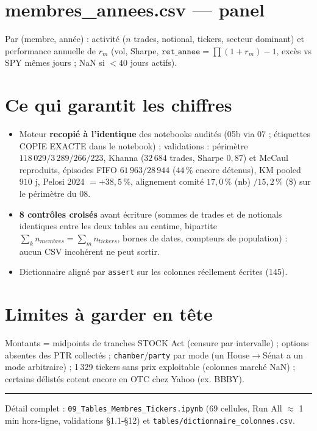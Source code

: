 \documentclass[10pt,a4paper,twocolumn]{article}
\begin{document}
\section{membres\_annees.csv --- panel}
Par (membre, année) : activité ($n$ trades, notional, tickers, secteur dominant) et performance
annuelle de $r_m$ (vol, Sharpe, $\texttt{ret\_annee} = \prod(1+r_m)-1$, excès vs SPY mêmes jours ;
NaN si $<40$ jours actifs).

\section{Ce qui garantit les chiffres}
\begin{itemize}
  \item Moteur \textbf{recopié à l'identique} des notebooks audités (05b via 07 ; étiquettes
  \og COPIE EXACTE\fg{} dans le notebook) ; validations : périmètre $118\,029 / 3\,289 / 266 / 223$,
  Khanna ($32\,684$ trades, Sharpe $0{,}87$) et McCaul reproduits, épisodes FIFO
  $61\,963 / 28\,944$ ($44\,\%$ encore détenus), KM pooled $910$ j, Pelosi 2024 $= +38{,}5\,\%$,
  alignement comité $17{,}0\,\%$ (nb) $/ 15{,}2\,\%$ (\$) sur le périmètre du 08.
  \item \textbf{8 contrôles croisés} avant écriture (sommes de trades et de notionals identiques
  entre les deux tables au centime, bipartite $\sum_k n_{membres} = \sum_m n_{tickers}$, bornes de
  dates, compteurs de population) : aucun CSV incohérent ne peut sortir.
  \item Dictionnaire aligné par \texttt{assert} sur les colonnes réellement écrites (145).
\end{itemize}

\section{Limites à garder en tête}
Montants = midpoints de tranches STOCK Act (censure par intervalle) ; options absentes des PTR
collectés ; \texttt{chamber}/\texttt{party} par mode (un House$\to$Sénat a un mode arbitraire) ;
1\,329 tickers sans prix exploitable (colonnes marché NaN) ; certains \og délistés\fg{} cotent
encore en OTC chez Yahoo (ex. BBBY).

\vspace{3pt}
\hrule
\vspace{2pt}
{\footnotesize\color{gris} Détail complet : \texttt{09\_Tables\_Membres\_Tickers.ipynb}
(69 cellules, Run All $\approx$ 1 min hors-ligne, validations \S1.1-\S12) et
\texttt{tables/dictionnaire\_colonnes.csv}.}
\end{document}
